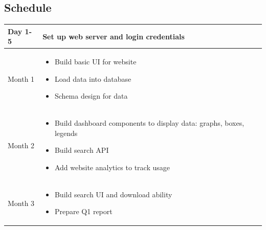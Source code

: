\subsection{Schedule}

\renewcommand{\arraystretch}{1.3}
\begin{table}[H]
  \centering
  \begin{tabularx}{\textwidth}{|l|X|}
      \hline
      Day 1-5 & Set up web server and login credentials \\\hline
      Month 1 & \begin{minipage}{\linewidth}
        \vspace{6pt}
        \begin{itemize}[itemsep=3pt,parsep=-1pt,leftmargin=*]
        \item Build basic UI for website
        \item Load data into database
        \item Schema design for data
        \end{itemize}
        \vspace{-2pt}
        \end{minipage}\\\hline
      Month 2 & \begin{minipage}{\linewidth}
        \vspace{6pt}
        \begin{itemize}[itemsep=3pt,parsep=-1pt,leftmargin=*]
        \item Build dashboard components to display data: graphs, boxes, legends
        \item Build search API
        \item Add website analytics to track usage
        \end{itemize}
        \vspace{-2pt}
        \end{minipage}\\\hline
      Month 3 & \begin{minipage}{\linewidth}
        \vspace{6pt}
        \begin{itemize}[itemsep=3pt,parsep=-1pt,leftmargin=*]
        \item Build search UI and download ability
        \item Prepare Q1 report
        \end{itemize}
        \vspace{-2pt}
        \end{minipage}\\\hline

\end{tabularx}
\end{table}
